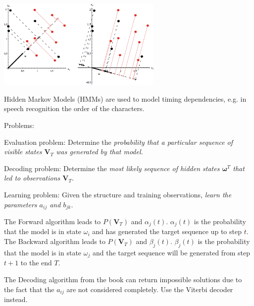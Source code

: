   \begin{minipage}{8cm}
    \includegraphics[width=8cm]{./images/fisher_discriminant.png}
  \end{minipage}
  
  \begin{minipage}{11cm}
    Hidden Markov Models (HMMs) are used to model timing dependencies, e.g.  
    in speech recognition the order of the characters.
    
    Problems:
    \begin{liste}
      \item Evaluation problem: Determine the \em probability \em that a particular sequence of 
      visible states $\bm V_T$ was generated by \em that model\em.
      \item Decoding problem: Determine the \em most likely sequence of hidden states \em $\bm \omega^T$ that
      led to observations $\bm V_T$.
      \item Learning problem: Given the structure and training observations, \em learn the parameters \em
      $a_{ij}$ and $b_{jk}$. 
    \end{liste}
    
      The Forward algorithm leads to $P(\bm V_T)$ and $\alpha_j(t)$. $\alpha_j(t)$ is the
      probability that the model is in state $\omega_i$ and has generated the target sequence up to step $t$.\\
      
      The Backward algorithm leads to $P(\bm V_T)$ and $\beta_j(t)$. $\beta_j(t)$ is the
      probability that the model is in state $\omega_j$ and the target sequence will be generated from step $t+1$ to the end $T$.
      
      
      The Decoding algorithm from the book can return impossible solutions due to the fact that
      the $a_{ij}$ are not considered completely. Use the Viterbi decoder instead.
    

\end{minipage}
